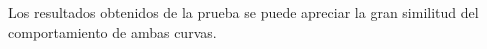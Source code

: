 \documentclass[12pt,a4paper]{article}
\begin{document}
	Los resultados obtenidos de la prueba se puede apreciar la gran similitud del comportamiento de ambas curvas.
	

	
\end{document}
